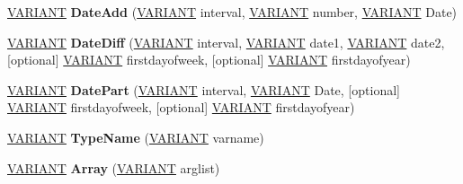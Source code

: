 \begin{DoxyCompactItemize}
\item 
\mbox{\label{interface_v_b_script___global_1_1_global_obj_abc42d05fc070516f3a4288620128d183}} 
\hyperlink{structtag_v_a_r_i_a_n_t}{V\+A\+R\+I\+A\+NT} {\bfseries Date\+Add} (\hyperlink{structtag_v_a_r_i_a_n_t}{V\+A\+R\+I\+A\+NT} interval, \hyperlink{structtag_v_a_r_i_a_n_t}{V\+A\+R\+I\+A\+NT} number, \hyperlink{structtag_v_a_r_i_a_n_t}{V\+A\+R\+I\+A\+NT} Date)
\item 
\mbox{\label{interface_v_b_script___global_1_1_global_obj_a2b1afdb249cdf8b4eb8b88168f82734f}} 
\hyperlink{structtag_v_a_r_i_a_n_t}{V\+A\+R\+I\+A\+NT} {\bfseries Date\+Diff} (\hyperlink{structtag_v_a_r_i_a_n_t}{V\+A\+R\+I\+A\+NT} interval, \hyperlink{structtag_v_a_r_i_a_n_t}{V\+A\+R\+I\+A\+NT} date1, \hyperlink{structtag_v_a_r_i_a_n_t}{V\+A\+R\+I\+A\+NT} date2, \mbox{[}optional\mbox{]} \hyperlink{structtag_v_a_r_i_a_n_t}{V\+A\+R\+I\+A\+NT} firstdayofweek, \mbox{[}optional\mbox{]} \hyperlink{structtag_v_a_r_i_a_n_t}{V\+A\+R\+I\+A\+NT} firstdayofyear)
\item 
\mbox{\label{interface_v_b_script___global_1_1_global_obj_a9f2be8b9cede78f545fb856c4a045ee4}} 
\hyperlink{structtag_v_a_r_i_a_n_t}{V\+A\+R\+I\+A\+NT} {\bfseries Date\+Part} (\hyperlink{structtag_v_a_r_i_a_n_t}{V\+A\+R\+I\+A\+NT} interval, \hyperlink{structtag_v_a_r_i_a_n_t}{V\+A\+R\+I\+A\+NT} Date, \mbox{[}optional\mbox{]} \hyperlink{structtag_v_a_r_i_a_n_t}{V\+A\+R\+I\+A\+NT} firstdayofweek, \mbox{[}optional\mbox{]} \hyperlink{structtag_v_a_r_i_a_n_t}{V\+A\+R\+I\+A\+NT} firstdayofyear)
\item 
\mbox{\label{interface_v_b_script___global_1_1_global_obj_a1977e61418bbb0ef8edfa2d86775fea8}} 
\hyperlink{structtag_v_a_r_i_a_n_t}{V\+A\+R\+I\+A\+NT} {\bfseries Type\+Name} (\hyperlink{structtag_v_a_r_i_a_n_t}{V\+A\+R\+I\+A\+NT} varname)
\item 
\mbox{\label{interface_v_b_script___global_1_1_global_obj_a574a1d77ca0226ee050b7a3e91bf2c3e}} 
\hyperlink{structtag_v_a_r_i_a_n_t}{V\+A\+R\+I\+A\+NT} {\bfseries Array} (\hyperlink{structtag_v_a_r_i_a_n_t}{V\+A\+R\+I\+A\+NT} arglist)
\item 

\end{DoxyCompactItemize}
